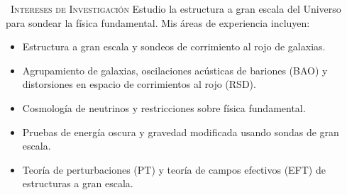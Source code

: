 \prefixmarker{}
\begin{rubric}{\faStar\ \textsc{Intereses de Investigación}}
\entry*[]%
Estudio la estructura a gran escala del Universo para sondear la física fundamental. Mis áreas de experiencia incluyen: \par
\begin{multicols}{2}
\begin{itemize}
	\item Estructura a gran escala y sondeos de corrimiento al rojo de galaxias.
	\item Agrupamiento de galaxias, oscilaciones acústicas de bariones (BAO) y distorsiones en espacio de corrimientos al rojo (RSD).
	\item Cosmología de neutrinos y restricciones sobre física fundamental.
	\item Pruebas de energía oscura y gravedad modificada usando sondas de gran escala.
	\item Teoría de perturbaciones (PT) y teoría de campos efectivos (EFT) de estructuras a gran escala.
\end{itemize}
\end{multicols}\par
\end{rubric}
